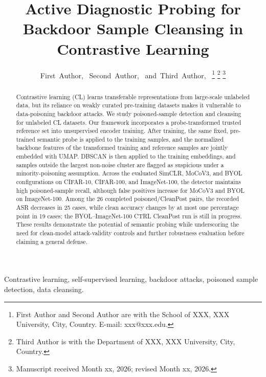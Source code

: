 \documentclass[10pt,journal]{IEEEtran}
\begin{document}
\title{Active Diagnostic Probing for Backdoor Sample Cleansing in Contrastive Learning}

\author{First~Author,~
        Second~Author,~
        and~Third~Author,~%
\thanks{First Author and Second Author are with the School of XXX, XXX University, City, Country. E-mail: xxx@xxx.edu.}%
\thanks{Third Author is with the Department of XXX, XXX University, City, Country.}%
\thanks{Manuscript received Month xx, 2026; revised Month xx, 2026.}}


\maketitle

\begin{abstract}
Contrastive learning (CL) learns transferable representations from large-scale unlabeled data, but its reliance on weakly curated pre-training datasets makes it vulnerable to data-poisoning backdoor attacks. We study poisoned-sample detection and cleansing for unlabeled CL datasets. Our framework incorporates a probe-transformed trusted reference set into unsupervised encoder training. After training, the same fixed, pre-trained semantic probe is applied to the training samples, and the normalized backbone features of the transformed training and reference samples are jointly embedded with UMAP. DBSCAN is then applied to the training embeddings, and samples outside the largest non-noise cluster are flagged as suspicious under a minority-poisoning assumption. Across the evaluated SimCLR, MoCoV3, and BYOL configurations on CIFAR-10, CIFAR-100, and ImageNet-100, the detector maintains high poisoned-sample recall, although false positives increase for MoCoV3 and BYOL on ImageNet-100. Among the 26 completed poisoned/CleanPost pairs, the recorded ASR decreases in 25 cases, while clean accuracy changes by at most one percentage point in 19 cases; the BYOL--ImageNet-100 CTRL CleanPost run is still in progress. These results demonstrate the potential of semantic probing while underscoring the need for clean-model attack-validity controls and further robustness evaluation before claiming a general defense.
\end{abstract}

\begin{IEEEkeywords}
Contrastive learning, self-supervised learning, backdoor attacks, poisoned sample detection, data cleansing.
\end{IEEEkeywords}
\end{document}
